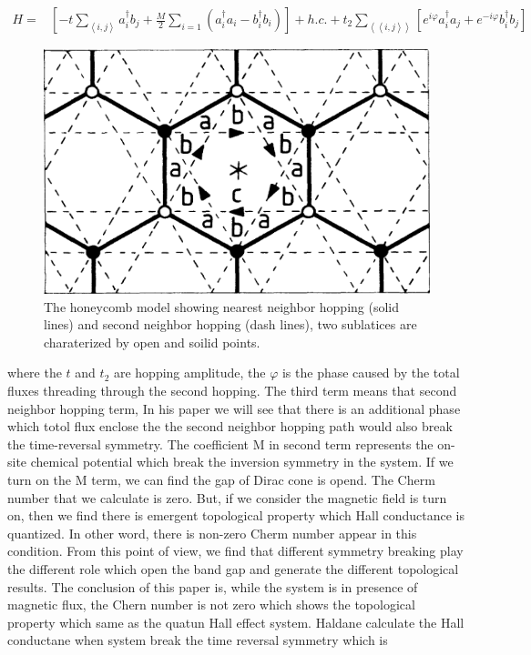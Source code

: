 \documentclass[12pt,a4paper]{article}
\begin{document}
\begin{equation*}
\begin{split}
  H = &[- t\sum_{\left<i,j\right>}a^{\dagger}_{i}b_{j} + \frac{M}{2}
  \sum_{i=1} (a^{\dagger}_{i}a_{i} - b^{\dagger}_{i}b_{i})] + h.c. + t_{2}\sum_{\left<\left<i,j\right>\right>}[e^{i\varphi}a^{\dagger}_{i}a_{j} +
  e^{-i\varphi}b^{\dagger}_{i}b_{j}] 
\end{split}
\end{equation*}


\begin{figure}[htpb]
  \centering
  \includegraphics[width=0.6\linewidth]{graphene.png}
  \caption{The honeycomb model showing nearest neighbor hopping (solid lines)
  and second neighbor hopping (dash lines), two sublatices are charaterized
by open and soilid points.}%
  \label{fig:graphene}
\end{figure}

\noindent
where the $t$ and $t_{2}$ are hopping amplitude, the $\varphi$ is the phase
caused by the total fluxes threading through the second hopping.
The third term means that second neighbor hopping term, In his
paper we will see that there is an additional phase which totol flux 
enclose the the second neighbor hopping path would also break the
time-reversal symmetry. The coefficient M in second term represents the 
on-site chemical potential which break the inversion symmetry in the system. 
If we turn on the M term, we can find the gap of Dirac cone is opend. The
Cherm number that we calculate is zero. But, if we consider the magnetic
field is turn on, then we find there is emergent topological property which
Hall conductance is quantized. In other word, there is non-zero Cherm
number appear in this condition. From this point of view, we find that
different symmetry breaking play the different role which open the band gap
and generate the different topological results.
The conclusion of this paper is, while the system is in presence of
magnetic flux, the Chern number is not zero which shows the topological
property which same as the quatun Hall effect system. Haldane calculate the
Hall conductane when system break the time reversal symmetry which is
\end{document}
